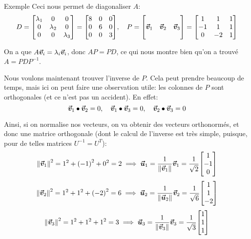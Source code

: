 \documentclass[a4paper]{article}
\begin{document}
\begin{parag}{Exemple}
    Ceci nous permet de diagonaliser $A$:
    \[D = \begin{bmatrix} \lambda_1 & 0 & 0 \\ 0 & \lambda_2 & 0 \\ 0 & 0 & \lambda_3 \end{bmatrix} = \begin{bmatrix} 8 & 0 & 0 \\ 0 & 6 & 0 \\ 0 & 0 & 3 \end{bmatrix}, \mathspace P = \begin{bmatrix}  &  &  \\ \bvec{v}_1 & \bvec{v}_2 & \bvec{v}_3 \\  &  &  \end{bmatrix} = \begin{bmatrix} 1 & 1 & 1 \\ -1 & 1 & 1 \\ 0 & -2 & 1 \end{bmatrix} \]

    On a que $A \bm{\protect\vec{v}}_i = \lambda_i \bm{\protect\vec{v}}_i$, donc $AP = PD$, ce qui nous montre bien qu'on a trouvé $A = PDP^{-1}$.

    Nous voulons maintenant trouver l'inverse de $P$. Cela peut prendre beaucoup de temps, mais ici on peut faire une observation utile: les colonnes de $P$ sont orthogonales (et ce n'est pas un accident). En effet:
    \[\bm{\protect\vec{v}}_1 \bullet \bm{\protect\vec{v}}_2 = 0, \quad \bm{\protect\vec{v}}_1 \bullet \bm{\protect\vec{v}}_3 = 0, \quad \bm{\protect\vec{v}}_2 \bullet \bm{\protect\vec{v}}_3 = 0\]

    Ainsi, si on normalise nos vecteurs, on va obtenir des vecteurs orthonormés, et donc une matrice orthogonale (dont le calcul de l'inverse est très simple, puisque, pour de telles matrices $U^{-1} = U^T$):
    \[\left\|\bvec{v}_1\right\|^2 = 1^2 + \left(-1\right)^2 + 0^2 = 2 \implies \bvec{u}_1 = \frac{1}{\left\|\bvec{v}_1\right\|} \bvec{v}_1 = \frac{1}{\sqrt{2}} \begin{bmatrix} 1 \\ -1 \\ 0 \end{bmatrix} \]
    \[\left\|\bvec{v}_2\right\|^2 = 1^2 + 1^2 + \left(-2\right)^2 = 6 \implies \bvec{u}_2 = \frac{1}{\left\|\bvec{u}_2\right\|} \bvec{v}_2 = \frac{1}{\sqrt{6}} \begin{bmatrix} 1 \\ 1 \\ -2 \end{bmatrix} \]
    \[\left\|\bvec{v}_3\right\|^2 = 1^2 + 1^2 + 1^2 = 3 \implies \bvec{u}_3 = \frac{1}{\left\|\bvec{v}_3\right\|} \bvec{v}_3 = \frac{1}{\sqrt{3}} \begin{bmatrix} 1 \\ 1 \\ 1 \end{bmatrix} \]


\end{parag}
\end{document}
